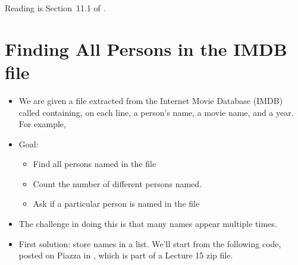 \documentclass[letterpaper,10pt,english]{sphinxmanual}
\begin{document}
Reading is Section 11.1 of .


\section{Finding All Persons in the IMDB file}
\label{\detokenize{lecture_notes/lec15_sets:finding-all-persons-in-the-imdb-file}}\begin{itemize}
\item {} 
We are given a file extracted from the Internet Movie Database (IMDB)
called  containing, on each line, a person’s name, a
movie name, and a year. For example,

%
\begin{sphinxVerbatim}[commandchars=\\\{\}]
           
\end{sphinxVerbatim}

\item {} 
Goal:
\begin{itemize}
\item {} 
Find all persons named in the file

\item {} 
Count the number of different persons named.

\item {} 
Ask if a particular person is named in the file

\end{itemize}

\item {} 
The challenge in doing this is that many names appear multiple times.

\item {} 
First solution: store names in a list. We’ll start from the
following code, posted on Piazza in
, which is part of a Lecture 15 zip file.

%
\begin{sphinxVerbatim}[commandchars=\\\{\}]
  
  \PYG{p}{[}\PYG{p}{]}
      
      
      \PYG{p}{[}\PYG{p}{]}
\end{sphinxVerbatim}


\end{itemize}
\end{document}
